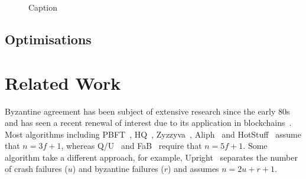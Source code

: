 \documentclass[manuscript]{acmart}
\begin{document}
\begin{figure}
    \centering
\end{figure}

\begin{figure}
    \centering
    
    \caption{Caption}
    \label{fig:my_label}
\end{figure}

\subsection{Optimisations}\label{sec:optimisations}


\section{Related Work}

Byzantine agreement has been subject of extensive research since the early 80s~\cite{Lamport:1982} and has seen a recent renewal of interest due to its application in blockchains~\cite{Bano:2019}.
Most algorithms including PBFT~\cite{Castro:1999}, HQ~\cite{Cowling:2006}, Zyzzyva~\cite{Kotla:2007}, Aliph~\cite{Aublin:2015} and HotStuff~\cite{Yin:2019} assume that $n=3f+1$, whereas Q/U~\cite{Abd:2005} and FaB~\cite{Martin:2006} require that $n=5f+1$.
Some algorithm take a different approach, for example, Upright~\cite{Clement:2009} separates the number of crash failures ($u$) and byzantine failures ($r$) and assumes $n=2u+r+1$.





\end{document}
